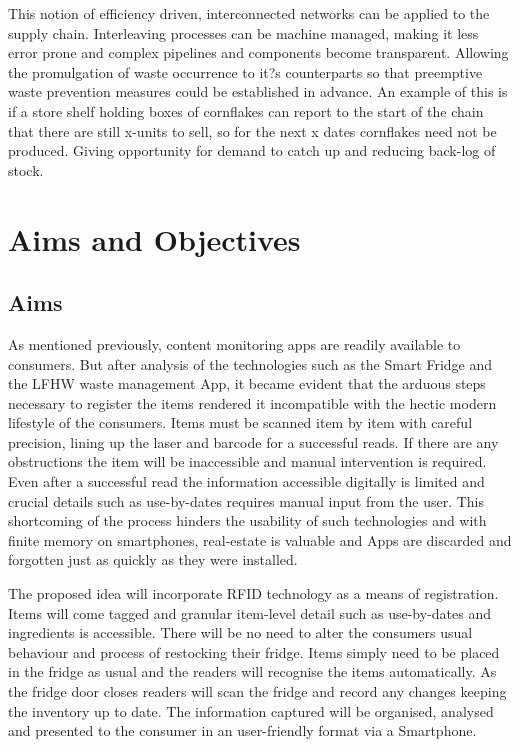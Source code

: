 \documentclass[a4paper, 11pt]{article}
\begin{document}
This notion of efficiency driven, interconnected networks can be applied to the supply chain. Interleaving processes can be machine managed, making it less error prone and complex pipelines and components become transparent. Allowing the promulgation of waste occurrence to it?s counterparts so that preemptive waste prevention measures could be established in advance. An example of this is if a store shelf holding boxes of cornflakes can report to the start of the chain that there are still x-units to sell, so for the next x dates cornflakes need not be produced. Giving opportunity for demand to catch up and reducing back-log of stock.



\clearpage
\section{Aims and Objectives}
\subsection{Aims}

As mentioned previously, content monitoring apps are readily available to consumers. But after analysis of the technologies such as the Smart Fridge and the LFHW waste management App, it became evident that the arduous steps necessary to register the items rendered it incompatible with the hectic modern lifestyle of the consumers. Items must be scanned item by item with careful precision, lining up the laser and barcode for a successful reads. If there are any obstructions the item will be inaccessible and manual intervention is required. Even after a successful read the information accessible digitally is limited and crucial details such as use-by-dates requires manual input from the user. This shortcoming of the process hinders the usability of such technologies and with finite memory on smartphones, real-estate is valuable and Apps are discarded and forgotten just as quickly as they were installed.

The proposed idea will incorporate RFID technology as a means of registration. Items will come tagged and granular item-level detail such as use-by-dates and ingredients is accessible. There will be no need to alter the consumers usual behaviour and process of restocking their fridge. Items simply need to be placed in the fridge as usual and the readers will recognise the items automatically. As the fridge door closes readers will scan the fridge and record any changes keeping the inventory up to date. The information captured will be organised, analysed and presented to the consumer in an user-friendly format via a Smartphone.
\end{document}
